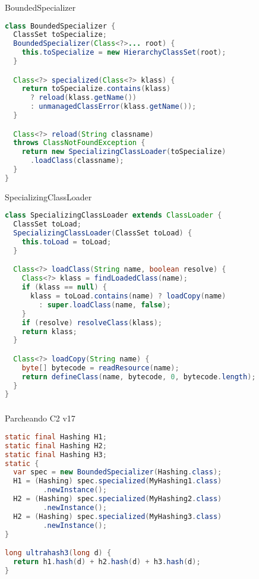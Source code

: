 \begin{frame}[fragile]
  \frametitle{\ft}
  \begin{block}{BoundedSpecializer}
    \begin{lstlisting}[language=java]
class BoundedSpecializer {
  ClassSet toSpecialize;
  BoundedSpecializer(Class<?>... root) {
    this.toSpecialize = new HierarchyClassSet(root);
  }

  Class<?> specialized(Class<?> klass) {
    return toSpecialize.contains(klass)
      ? reload(klass.getName())
      : unmanagedClassError(klass.getName());
  }

  Class<?> reload(String classname)
  throws ClassNotFoundException {
    return new SpecializingClassLoader(toSpecialize)
      .loadClass(classname);
  }
}
    \end{lstlisting}
  \end{block}
\end{frame}


\begin{frame}[fragile]
  \begin{block}{SpecializingClassLoader}
    \begin{lstlisting}[language=java]
class SpecializingClassLoader extends ClassLoader {
  ClassSet toLoad;
  SpecializingClassLoader(ClassSet toLoad) {
    this.toLoad = toLoad;
  }

  Class<?> loadClass(String name, boolean resolve) {
    Class<?> klass = findLoadedClass(name);
    if (klass == null) {
      klass = toLoad.contains(name) ? loadCopy(name)
        : super.loadClass(name, false);
    }
    if (resolve) resolveClass(klass);
    return klass;
  }

  Class<?> loadCopy(String name) {
    byte[] bytecode = readResource(name);
    return defineClass(name, bytecode, 0, bytecode.length);
  }
}
    \end{lstlisting}
  \end{block}
\end{frame}


\begin{frame}[fragile]
  \frametitle{\ft}
  \begin{block}{Parcheando C2 v17}
    \begin{lstlisting}[language=java]
static final Hashing H1;
static final Hashing H2;
static final Hashing H3;
static {
  var spec = new BoundedSpecializer(Hashing.class);
  H1 = (Hashing) spec.specialized(MyHashing1.class)
         .newInstance();
  H2 = (Hashing) spec.specialized(MyHashing2.class)
         .newInstance();
  H2 = (Hashing) spec.specialized(MyHashing3.class)
         .newInstance();
}

long ultrahash3(long d) {
  return h1.hash(d) + h2.hash(d) + h3.hash(d);
}
    \end{lstlisting}
  \end{block}
\end{frame}


